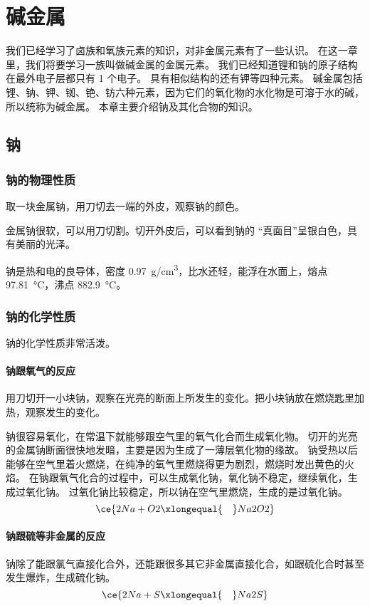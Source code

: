 \chapter{碱金属}
我们已经学习了卤族和氧族元素的知识，对非金属元素有了一些认识。
在这一章里，我们将要学习一族叫做碱金属的金属元素。
我们已经知道锂和钠的原子结构在最外电子层都只有 1 个电子。
具有相似结构的还有钾等四种元素。
碱金属包括锂、钠、钾、铷、铯、钫六种元素，因为它们的氧化物的水化物是可溶于水的碱，所以统称为碱金属。
本章主要介绍钠及其化合物的知识。

\section{钠}
\subsection{钠的物理性质}
\begin{Experiment}
  取一块金属钠，用刀切去一端的外皮，观察钠的颜色。
\end{Experiment}
金属钠很软，可以用刀切割。切开外皮后，可以看到钠的 “真面目”呈银白色，具有美丽的光泽。

钠是热和电的良导体，密度 \qty{0.97}{g/cm^3}，比水还轻，能浮在水面上，熔点 \qty{97.81}{\celsius}，沸点 \qty{882.9}{\celsius}。
\subsection{钠的化学性质}
钠的化学性质非常活泼。

\subsubsection{钠跟氧气的反应}
\begin{Experiment}
  用刀切开一小块钠，观察在光亮的断面上所发生的变化。把小块钠放在燃烧匙里加热，观察发生的变化。
\end{Experiment}
钠很容易氧化，在常温下就能够跟空气里的氧气化合而生成氧化物。
切开的光亮的金属钠断面很快地发暗，主要是因为生成了一薄层氧化物的缘故。
钠受热以后能够在空气里着火燃烧，在纯净的氧气里燃烧得更为剧烈，燃烧时发出黄色的火焰。
在钠跟氧气化合的过程中，可以生成氧化钠，氧化钠不稳定，继续氧化，生成过氧化钠。
过氧化钠比较稳定，所以钠在空气里燃烧，生成的是过氧化钠。
\[ \ce{2Na + O2 \xlongequal{\quad} Na2O2} \]

\subsubsection{钠跟硫等非金属的反应}
钠除了能跟氯气直接化合外，还能跟很多其它非金属直接化合，如跟硫化合时甚至发生爆炸，生成硫化钠。
\[ \ce{2Na + S \xlongequal{\quad} Na2S} \]

